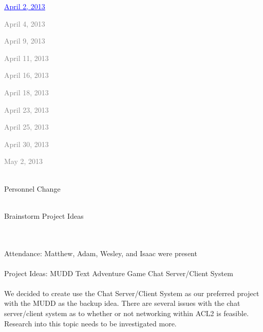 \documentclass[11pt, letterpaper]{report}
\begin{document}
\begin{description}
\begin{itemize}
\item \hyperlink{April 2, 2013}{\textcolor{blue}{\underline{April 2, 2013}}} 
\\ \textcolor{gray}{
\item April 4, 2013 
\item April 9, 2013 
\item April 11, 2013 
\item April 16, 2013 
\item April 18, 2013 
\item April 23, 2013 
\item April 25, 2013 
\item April 30, 2013 
\item May 2, 2013 }


\end{itemize}
\newpage

\setcounter{page}{1}

\item[\Large January 17, 2013]
\hypertarget{January 17, 2013} {}
\item[Old Business] \hfill \\
\subitem Personnel Change
\item[New Business] \hfill \\
\subitem Brainstorm Project Ideas
\item[Notes] \hfill \\ \hfill \\
Attendance: Matthew, Adam, Wesley, and Isaac were present \\ \\
Project Ideas: 
\subitem MUDD Text Adventure Game
\subitem Chat Server/Client System \\ \\
We decided to create use the Chat Server/Client System as our preferred project with the MUDD as the backup idea. There are several issues with the chat server/client system as to whether or not networking within ACL2 is feasible. Research into this topic needs to be investigated more.


\end{description}
\end{document}

